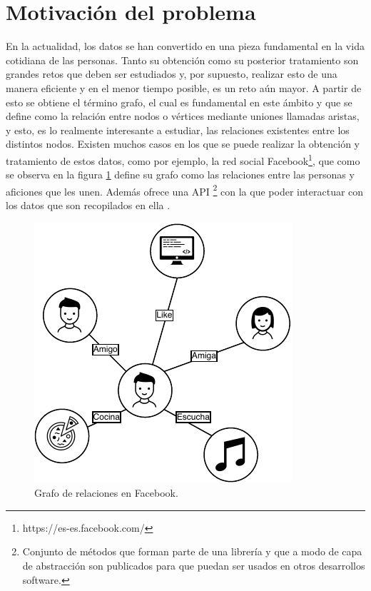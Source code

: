 \section{Motivación del problema}

En la actualidad, los datos se han convertido en una pieza fundamental en la vida cotidiana de las personas. Tanto su obtención como su posterior tratamiento son grandes retos que deben ser estudiados y, por supuesto, realizar esto de una manera eficiente y en el menor tiempo posible, es un reto aún mayor. A partir de esto se obtiene el término grafo, el cual es fundamental en este ámbito y que se define como la relación entre nodos o vértices mediante uniones llamadas aristas, y esto, es lo realmente interesante a estudiar, las relaciones existentes entre los distintos nodos.\newline
Existen muchos casos en los que se puede realizar la obtención y tratamiento de estos datos, como por ejemplo, la red social Facebook\footnote{https://es-es.facebook.com/}, que como se observa en la figura \ref{fig:facebook-graph} define su grafo como las relaciones entre las personas y aficiones que les unen. Además ofrece una \gls{API} \footnote{Conjunto de métodos que forman parte de una librería y que a modo de capa de abstracción son publicados para que puedan ser usados en otros desarrollos software.} con la que poder interactuar con los datos que son recopilados en ella \cite{api-graph}.

 \begin{figure}[H]
	\centering
	\includegraphics[scale=0.8]{Figures/facebook-graph.pdf}
	\caption{Grafo de relaciones en Facebook.}
	\label{fig:facebook-graph}
\end{figure}

